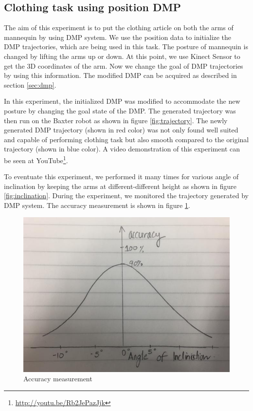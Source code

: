 \documentclass[sigconf]{acmart}
\begin{document}
\subsection{Clothing task using position DMP}
The aim of this experiment is to put the clothing article on both the arms of mannequin by using DMP system. We use the position data to initialize the DMP trajectories, which are being used in this task. The posture of mannequin is changed by lifting the arms up or down. At this point, we use Kinect Sensor to get the 3D coordinates of the arm. Now we change the goal of DMP trajectories by using this information. The modified DMP can be acquired as described in section \ref{sec:dmp}.

In this experiment, the initialized DMP was modified to accommodate the new posture by changing the goal state of the DMP. The generated trajectory was then run on the Baxter robot as shown in figure \ref{fig:trajectory}. The newly generated DMP trajectory (shown in red color) was not only found well suited and capable of performing clothing task but also smooth compared to the original trajectory (shown in blue color). A video demonstration of this experiment can be seen at YouTube\footnote{\url{http://youtu.be/Rb2JePazJjk}}.

To eventuate this experiment, we performed it many times for various angle of inclination by keeping the arms at different-different height as shown in figure \ref{fig:inclination}. During the experiment, we monitored the trajectory generated by DMP system. The accuracy measurement is shown in figure \ref{fig:accuracy}.

\begin{figure}
	\includegraphics[width=\linewidth]{accuracy}
	\caption{Accuracy measurement}
	\label{fig:accuracy}
\end{figure}
\end{document}
